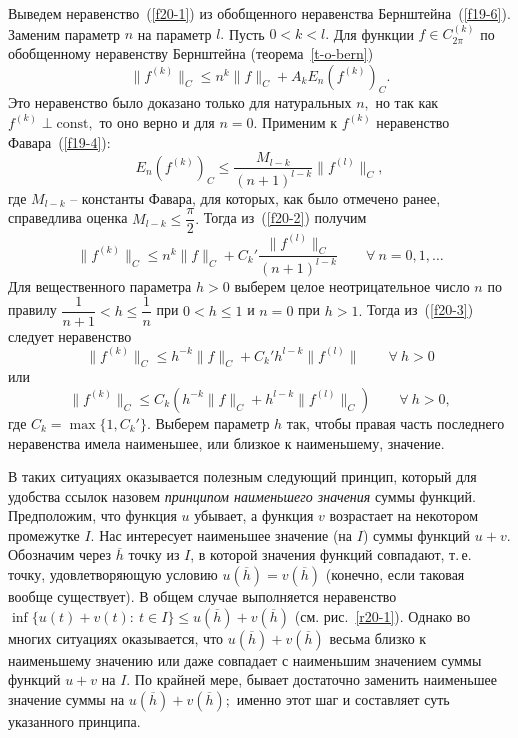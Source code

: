  Выведем неравенство~(\ref{f20-1}) из обобщенного неравенства
 Бернштейна~(\ref{f19-6}).  Заменим  параметр $n$ на параметр  $l.$ Пусть     $0<k<l.$
 Для функции  $f\in C^{(k)}_{{2\pi}}$
 по обобщенному неравенству Бернштейна (теорема~\ref{t-o-bern})
  \begin{equation}\label{f20-2}
 \|f^{(k)}\|_C\le n^k \|f\|_C+A_kE_n(f^{(k)})_C.
  \end{equation}
 Это неравенство было доказано только для натуральных $n,$
 но так как $f^{(k)}\perp \mbox{const},$ то оно верно и для  $n=0.$
 Применим к $f^{(k)}$ неравенство Фавара~(\ref{f19-4}):
 $$
 E_n(f^{(k)})_C\le \frac{M_{l-k}}{(n+1)^{l-k}}\|f^{(l)}\|_C,
 $$
где $M_{l-k}$ -- константы Фавара, для которых, как было
отмечено ранее, справедлива оценка $M_{l-k}\le \dfrac{\pi}{2}.$
 Тогда из~(\ref{f20-2}) получим
 \begin{equation}\label{f20-3}
 \|f^{(k)}\|_C\le
 n^k\|f\|_C+C_k'\frac{\|f^{(l)}\|_C}{(n+1)^{l-k}}\qquad \forall\
 n=0,1,\ldots
 \end{equation}
 Для вещественного параметра $h>0$ выберем целое неотрицательное число $n$  по правилу
 $\dfrac{1}{n+1}<
 h\le \dfrac{1}{n}$ при $0<h\le 1$ и $n=0$ при $h>1.$
 Тогда из~(\ref{f20-3}) следует  неравенство
 $$
 \|f^{(k)}\|_C\le h^{-k}\|f\|_C+C_k' h^{l-k}\|f^{(l)}\|\qquad \forall\
 h>0
 $$
 или
 \begin{equation}\label{f20-4}
 \|f^{(k)}\|_C\le C_k (h^{-k}\|f\|_C+h^{l-k}\|f^{(l)}\|_C)\qquad
 \forall\ h>0,
 \end{equation}
 где $C_k=\max\{1,C_k'\}.$
 Выберем параметр $h$ так, чтобы правая часть последнего  неравенства  имела  наименьшее,
 или близкое к наименьшему,  значение.

 В таких ситуациях оказывается полезным следующий принцип, который для удобства ссылок
 назовем {\it принципом наименьшего значения} суммы функций.
 Предположим, что функция $u$ убывает, а функция $v$ возрастает на некотором промежутке
 $I.$ Нас интересует наименьшее значение (на $I$)  суммы функций $u+v.$
 Обозначим через $\overline h$ точку из  $I$, в которой значения функций совпадают,
 т.\,е. точку, удовлетворяющую условию $u(\overline h)=v(\overline h)$
 (конечно, если таковая вообще существует). В общем случае выполняется
 неравенство $\inf\{u(t)+v(t):\ t\in I\}\le u(\overline h)+v(\overline
 h)$ (см. рис.~\ref{r20-1}).
 Однако во многих ситуациях оказывается, что  $u(\overline h)+v(\overline h)$
 весьма близко к наименьшему значению или даже совпадает с наименьшим значением
 суммы функций $u+v$ на $I.$ По крайней мере, бывает достаточно заменить наименьшее
 значение суммы на  $u(\overline h)+v(\overline h);$ именно этот шаг и составляет
 суть указанного принципа.


